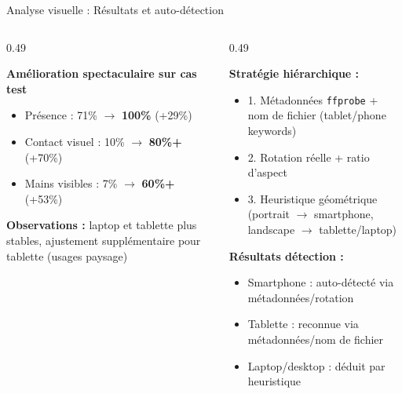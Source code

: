 \documentclass[10pt,aspectratio=169]{beamer}
\begin{document}
\begin{frame}{Analyse visuelle : Résultats et auto-détection}
\begin{columns}[T]
\begin{column}{0.49\textwidth}
\begin{tcolorbox}[title=Résultats smartphone, colframe=accent, colback=accent!3]
\small
\textbf{Amélioration spectaculaire sur cas test}
\begin{itemize}
    \item Présence : 71\% $\rightarrow$ \textbf{100\%} (+29\%)
    \item Contact visuel : 10\% $\rightarrow$ \textbf{80\%+} (+70\%)
    \item Mains visibles : 7\% $\rightarrow$ \textbf{60\%+} (+53\%)
\end{itemize}
\textbf{Observations :} laptop et tablette plus stables, ajustement supplémentaire pour tablette (usages paysage)
\end{tcolorbox}
\end{column}
\begin{column}{0.49\textwidth}
\begin{tcolorbox}[title=Auto-détection, colframe=primary, colback=primary!3]
\small
\textbf{Stratégie hiérarchique :}
\begin{itemize}
    \item 1. Métadonnées \texttt{ffprobe} + nom de fichier (tablet/phone keywords)
    \item 2. Rotation réelle + ratio d'aspect
    \item 3. Heuristique géométrique (portrait $\rightarrow$ smartphone, landscape $\rightarrow$ tablette/laptop)
\end{itemize}
\textbf{Résultats détection :}
\begin{itemize}
    \item Smartphone : auto-détecté via métadonnées/rotation
    \item Tablette : reconnue via métadonnées/nom de fichier
    \item Laptop/desktop : déduit par heuristique
\end{itemize}
\end{tcolorbox}
\end{column}
\end{columns}
\end{frame}
\end{document}
